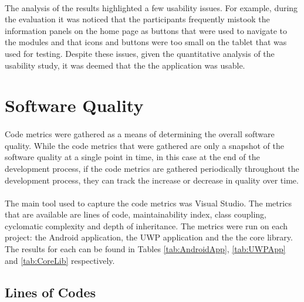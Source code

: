 {{	%
	}
	
	\paragraph{}{
	The analysis of the results highlighted a few usability issues. For example, during the evaluation it was noticed that the participants frequently mistook the information panels on the home page as buttons that were used to navigate to the modules and that icons and buttons were too small on the tablet that was used for testing. Despite these issues, given the quantitative analysis of the usability study, it was deemed that the the application was usable.
	}		
	\label{sec:Usability}
}

\section{Software Quality}{
	\label{sec:Quality}
	\paragraph{}{
	Code metrics were gathered as a means of determining the overall software quality. While the code metrics that were gathered are only a snapshot of the software quality at a single point in time, in this case at the end of the development process, if the code metrics are gathered periodically throughout the development process, they can track the increase or decrease in quality over time.
	}
	\paragraph{}{
	The main tool used to capture the code metrics was Visual Studio. The metrics that are available are lines of code, maintainability index, class coupling, cyclomatic complexity and depth of inheritance. The metrics were run on each project: the Android application, the UWP application and the the core library. The results for each can be found in Tables \ref{tab:AndroidApp}, \ref{tab:UWPApp} and \ref{tab:CoreLib} respectively.
	}
	
	\subsection*{Lines of Codes}
}
